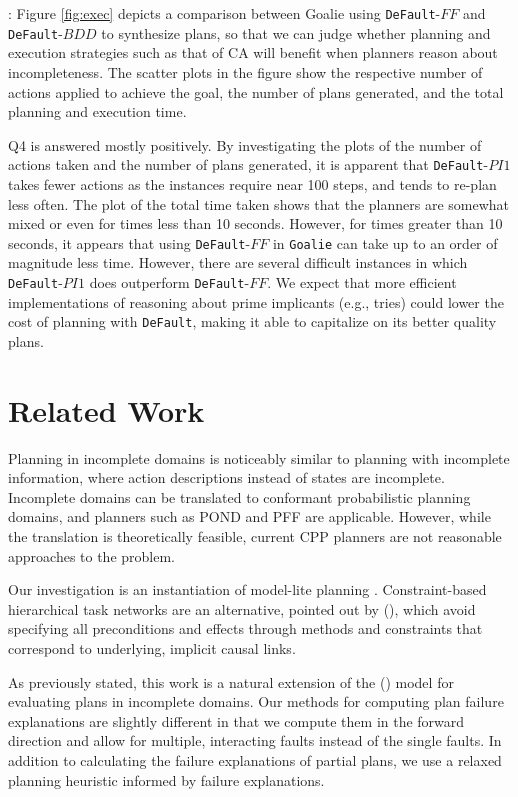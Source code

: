 \documentclass[letterpaper]{article}
\def\und#1{\noindent{\bf #1}:}
\def\default{{\tt DeFault}}
\def\goalie{{\tt Goalie}}
\def\citep#1{\cite{#1}}
\def\citet#1{\citeauthor{#1} (\citeyear{#1})}
\begin{document}
 

\und{On-line Planning \& Execution Results} Figure \ref{fig:exec} depicts a
comparison between Goalie using \default{}-$FF$ and \default{}-$BDD$ to
synthesize plans, so that we can judge whether planning and execution strategies
such as that of CA will benefit when planners reason about incompleteness.  The
scatter plots in the figure show the respective number of actions applied to
achieve the goal, the number of plans generated, and the total planning and
execution time.

Q4 is answered mostly positively. By investigating the plots of the number of
actions taken and the number of plans generated, it is apparent that
\default-$PI1$ takes fewer actions as the instances require near 100 steps, and
tends to re-plan less often. The plot of the total time taken shows that the
planners are somewhat mixed or even for times less than 10 seconds.  However,
for times greater than 10 seconds, it appears that using \default-$FF$ in
\goalie{} can take up to an order of magnitude less time.  However, there are
several difficult instances in which \default-$PI1$ does outperform
\default-$FF$.    We expect that more efficient implementations of reasoning
about prime implicants (e.g., tries) could lower the cost of planning with
\default{}, making it able to capitalize on its better quality plans.
 

\section{Related Work}

Planning in incomplete domains is noticeably similar to planning with incomplete
information, where action descriptions instead of states are incomplete. 
Incomplete domains can be translated to conformant probabilistic planning
domains, and planners such as POND \citep{aij-mclug} and PFF \citep{pff} are
applicable.  However, while the translation is theoretically feasible, current
CPP planners are not reasonable approaches to the problem.  
 

Our investigation is an instantiation of model-lite planning \citep{modellite}.
Constraint-based hierarchical task networks are an alternative, pointed out by
\citet{modellite},  which avoid specifying all preconditions and effects through
methods and constraints that correspond to underlying, implicit causal links.

As previously stated, this work is a natural extension of the \citet{Garland02}
model for evaluating plans in incomplete domains.  Our methods for computing
plan failure explanations are slightly different in that we compute them in the
forward direction and allow for multiple, interacting faults instead of the
single faults.  In addition to calculating the failure explanations of partial
plans, we use a relaxed planning heuristic informed by failure
explanations.
\end{document}
